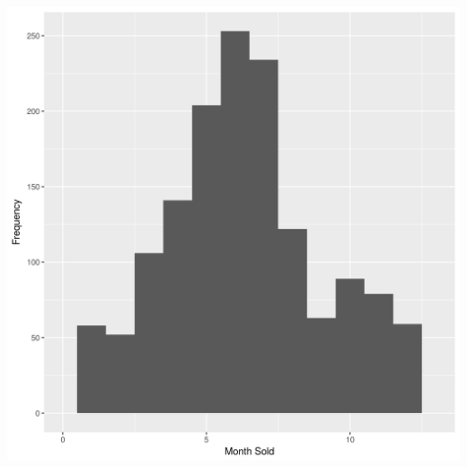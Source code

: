 \documentclass[12pt]{article}
\begin{document}
\begin{flushleft}
\centering
    \includegraphics[scale = 0.60]{plot3.png}\\[1.0 cm]
\end{flushleft}
\end{document}
